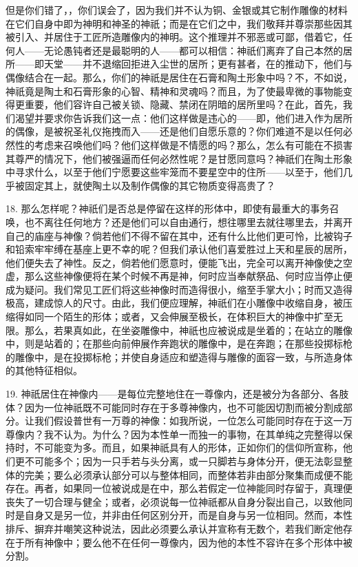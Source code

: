但是你们错了，，你们误会了，因为我们并不认为铜、金银或其它制作雕像的材料在它们自身中即为神明和神圣的神祇；而是在它们之中，我们敬拜并尊崇那些因其被引入、并居住于工匠所造雕像内的神明。这个推理并不邪恶或可鄙，借着它，任何人——无论愚钝者还是最聪明的人——都可以相信：神祇们离弃了自己本然的居所——即天堂——并不退缩回拒进入尘世的居所；更有甚者，在的推动下，他们与偶像结合在一起。那么，你们的神祇是居住在石膏和陶土形象中吗？不，不如说，神祇竟是陶土和石膏形象的心智、精神和灵魂吗？而且，为了使最卑微的事物能变得更重要，他们容许自己被关锁、隐藏、禁闭在阴暗的居所里吗？在此，首先，我们渴望并要求你告诉我们这一点：他们这样做是违心的——即，他们进入作为居所的偶像，是被祝圣礼仪拖拽而入——还是他们自愿乐意的？你们难道不是以任何必然性的考虑来召唤他们吗？他们这样做是不情愿的吗？那么，怎么有可能在不损害其尊严的情况下，他们被强逼而任何必然性呢？是甘愿同意吗？神祇们在陶土形象中寻求什么，以至于他们宁愿要这些牢笼而不要星空中的住所——以至于，他们几乎被固定其上，就使陶土以及制作偶像的其它物质变得高贵了？\par

18. 那么怎样呢？神祇们是否总是停留在这样的形体中，即使有最重大的事务召唤，也不离往任何地方？还是他们可以自由通行，想往哪里去就往哪里去，并离开自己的庙座与神像？倘若他们不得不留在其中，还有什么比他们更可怜，比被钩子和铅索牢牢缚在基座上更不幸的呢？但我们承认他们喜爱胜过上天和星辰的居所，他们便失去了神性。反之，倘若他们愿意时，便能飞出，完全可以离开神像使之空虚，那么这些神像便将在某个时候不再是神，何时应当奉献祭品、何时应当停止便成为疑问。我们常见工匠们将这些神像时而造得很小，缩至手掌大小；时而又造得极高，建成惊人的尺寸。由此，我们便应理解，神祇们在小雕像中收缩自身，被压缩得如同一个陌生的形体；或者，又会伸展至极长，在体积巨大的神像中扩至无限。那么，若果真如此，在坐姿雕像中，神祇也应被说成是坐着的；在站立的雕像中，则是站着的；在那些向前伸展作奔跑状的雕像中，是在奔跑；在那些投掷标枪的雕像中，是在投掷标枪；并使自身适应和塑造得与雕像的面容一致，与所造身体的其他特征相似。\par

19. 神祇居住在神像内——是每位完整地住在一尊像内，还是被分为各部分、各肢体？因为一位神祇既不可能同时存在于多尊神像内，也不可能因切割而被分割成部分。让我们假设普世有一万尊的神像：如我所说，一位怎么可能同时存在于这一万尊像内？我不认为。为什么？因为本性单一而独一的事物，在其单纯之完整得以保持时，不可能变为多。而且，如果神祇具有人的形体，正如你们的信仰所宣称，他们更不可能多个；因为一只手若与头分离，或一只脚若与身体分开，便无法彰显整体的完美；要么必须承认部分可以与整体相同，而整体若非由部分聚集而成便不能存在。再者，如果同一位被说成是在中，那么若假定一位神能同时存留于，真理便丧失了一切合理与健全；或者，必须说每一位神祇都从自身分裂出自己，以致他同时是自身又是另一位，并非由任何区别分开，而是自身与另一位相同。然而，本性排斥、摒弃并嘲笑这种说法，因此必须要么承认并宣称有无数个，若我们断定他存在于所有神像中；要么他不在任何一尊像内，因为他的本性不容许在多个形体中被分割。\par

